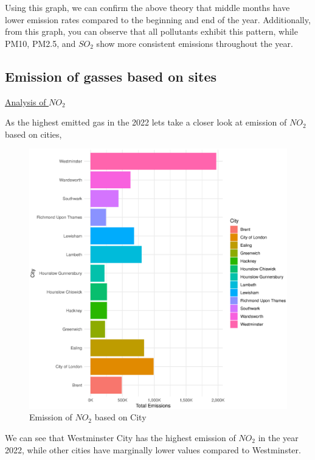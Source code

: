 \documentclass[]{article}
\begin{document}
Using this graph, we can confirm the above theory that middle months have lower emission rates compared to the beginning and end of the year. Additionally, from this graph, you can observe that all pollutants exhibit this pattern, while PM10, PM2.5, and $SO_2$ show more consistent emissions throughout the year.

\pagebreak

\subsection*{Emission of gasses based on sites}
\vspace{12pt}
\underline{{\large Analysis of $NO_2$}}

\vspace{12pt}
As the highest emitted gas in the 2022 lets take a closer look at emission of $NO_2$ based on cities,

\begin{figure}[H]
	\centering
	\includegraphics[width=1\textwidth]{Graphs/no2_by_site_graph.eps}
	\caption{Emission of $NO_2$ based on City}
	\label{fig:no2.1 }
\end{figure}

We can see that Westminster City has the highest emission of $NO_2$ in the year 2022, while other cities have marginally lower values compared to Westminster.
\end{document}
